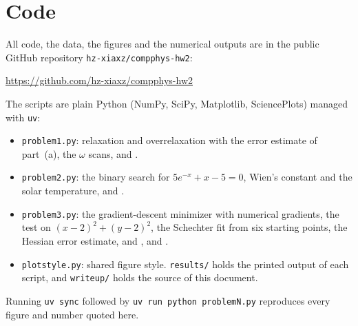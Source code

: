 \documentclass[11pt]{article}
\newcommand{\code}[1]{\texttt{#1}}
\begin{document}
\section*{Code}

All code, the data, the figures and the numerical outputs are in the public
GitHub repository \code{hz-xiaxz/compphys-hw2}:
\begin{center}
\url{https://github.com/hz-xiaxz/compphys-hw2}
\end{center}
The scripts are plain Python (NumPy, SciPy, Matplotlib, SciencePlots) managed
with \code{uv}:
\begin{itemize}
\item \code{problem1.py}: relaxation and overrelaxation with the error estimate
of part~(a), the $\omega$ scans, and .
\item \code{problem2.py}: the binary search for $5e^{-x}+x-5=0$, Wien's
constant and the solar temperature, and .
\item \code{problem3.py}: the gradient-descent minimizer with numerical
gradients, the test on $(x-2)^2+(y-2)^2$, the Schechter fit from six starting
points, the Hessian error estimate, and ,
 and .
\item \code{plotstyle.py}: shared figure style. \code{results/} holds the
printed output of each script, and \code{writeup/} holds the source of this
document.
\end{itemize}
Running \code{uv sync} followed by \code{uv run python problemN.py} reproduces
every figure and number quoted here.
\end{document}
